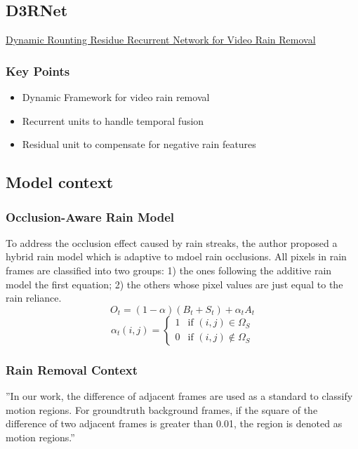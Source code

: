 \documentclass{article}
\begin{document}
\subsection{D3RNet}
\href{http://www.icst.pku.edu.cn/struct/Pub%20Files/2019/ywh_tip19.pdf}{Dynamic Rounting Residue Recurrent Network for Video Rain Removal}
\subsubsection{Key Points}
\begin{itemize}
\item Dynamic Framework for video rain removal
\item Recurrent units to handle temporal fusion
\item Residual unit to compensate for negative rain features
\end{itemize}
\subsection{Model context}
\subsubsection{Occlusion-Aware Rain Model}
To address the occlusion effect caused by rain streaks, the author proposed a hybrid rain model which is adaptive to mdoel rain occlusions. All pixels in rain frames are classified into two groups: 1) the ones following the additive rain model the first equation; 2) the others whose pixel values are just equal to the rain reliance.
\begin{equation}
O_t=(1-\alpha)(B_t+S_t)+\alpha_tA_t
\end{equation}
\begin{equation}
\alpha_t(i,j)=
	\begin{cases}
		1 & \text{if $(i,j)\in \Omega_S$}\\
		0 & \text{if $(i,j)\not\in \Omega_S$}
	\end{cases}
\end{equation}
\subsubsection{Rain Removal Context}
''In our work, the difference of adjacent frames are used as a standard to classify motion regions. For groundtruth background frames, if the square of the difference of two adjacent frames is greater than 0.01, the region is denoted as motion regions.''
\end{document}
